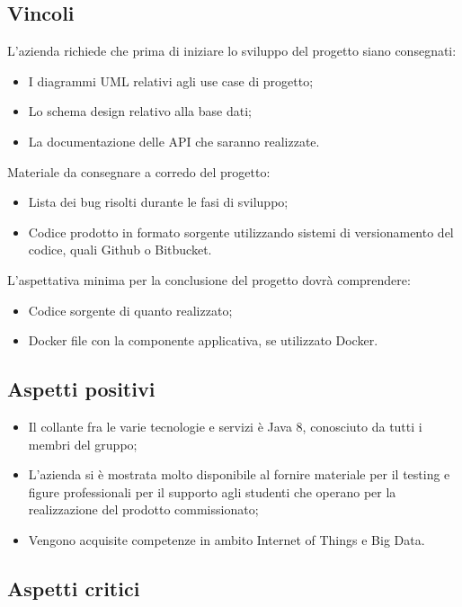 \subsection{Vincoli}
L'azienda richiede che prima di iniziare lo sviluppo del progetto siano consegnati:
\begin{itemize}
\item I diagrammi UML relativi agli use case di progetto;
\item Lo schema design relativo alla base dati;
\item La documentazione delle API che saranno realizzate. 
\end{itemize}
Materiale da consegnare a corredo del progetto: 
\begin{itemize}
\item Lista dei bug risolti durante le fasi di sviluppo;
\item Codice prodotto in formato sorgente utilizzando sistemi di versionamento del codice, quali Github o Bitbucket.
\end{itemize}
L'aspettativa minima per la conclusione del progetto dovrà comprendere: 
\begin{itemize}
\item Codice sorgente di quanto realizzato;
\item Docker file con la componente applicativa, se utilizzato Docker.
\end{itemize}

\subsection{Aspetti positivi}
\begin{itemize}
\item Il collante fra le varie tecnologie e servizi è Java 8, conosciuto da tutti i membri del gruppo;
\item L'azienda si \`e mostrata molto disponibile al fornire materiale per il testing e figure professionali per il supporto agli studenti che operano per la realizzazione del prodotto commissionato;
\item Vengono acquisite competenze in ambito Internet of Things e Big Data.
\end{itemize}

\subsection{Aspetti critici}

